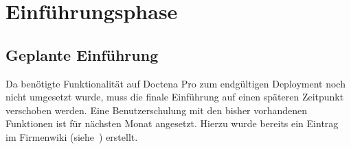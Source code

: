 \section{Einführungsphase}
\label{sec:Einfuehrungsphase}
\subsection{Geplante Einführung}
\label{subsec:EinführungGeplant}

Da benötigte Funktionalität auf Doctena Pro zum endgültigen Deployment noch nicht umgesetzt wurde, muss die finale Einführung auf einen späteren Zeitpunkt verschoben werden. Eine Benutzerschulung mit den bisher vorhandenen Funktionen ist für nächsten Monat angesetzt. Hierzu wurde bereits ein Eintrag im Firmenwiki (siehe~) erstellt.

